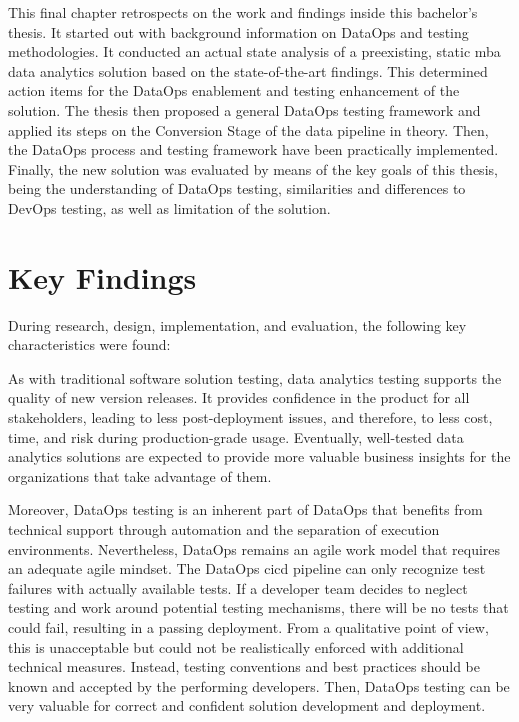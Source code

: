
This final chapter retrospects on the work and findings inside this bachelor's thesis. It started out with background information on DataOps and testing methodologies. It conducted an actual state analysis of a preexisting, static \ac{mba} data analytics solution based on the state-of-the-art findings. This determined action items for the DataOps enablement and testing enhancement of the solution. The thesis then proposed a general DataOps testing framework and applied its steps on the Conversion Stage of the data pipeline in theory. Then, the DataOps process and testing framework have been practically implemented. Finally, the new solution was evaluated by means of the key goals of this thesis, being the understanding of DataOps testing, similarities and differences to DevOps testing, as well as limitation of the solution.

\section{Key Findings}
During research, design, implementation, and evaluation, the following key characteristics were found:

As with traditional software solution testing, data analytics testing supports the quality of new version releases. It provides confidence in the product for all stakeholders, leading to less post-deployment issues, and therefore, to less cost, time, and risk during production-grade usage. Eventually, well-tested data analytics solutions are expected to provide more valuable business insights for the organizations that take advantage of them.

Moreover, DataOps testing is an inherent part of DataOps that benefits from technical support through automation and the separation of execution environments. Nevertheless, DataOps remains an agile work model that requires an adequate agile mindset. The DataOps \ac{cicd} pipeline can only recognize test failures with actually available tests. If a developer team decides to neglect testing and work around potential testing mechanisms, there will be no tests that could fail, resulting in a passing deployment. From a qualitative point of view, this is unacceptable but could not be realistically enforced with additional technical measures. Instead, testing conventions and best practices should be known and accepted by the performing developers. Then, DataOps testing can be very valuable for correct and confident solution development and deployment.

